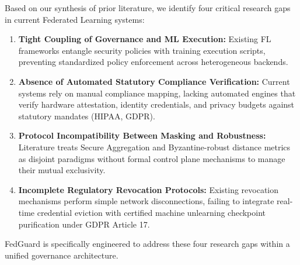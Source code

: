 Based on our synthesis of prior literature, we identify four critical research gaps in current Federated Learning systems:
\begin{enumerate}
    \item \textbf{Tight Coupling of Governance and ML Execution:} Existing FL frameworks entangle security policies with training execution scripts, preventing standardized policy enforcement across heterogeneous backends.
    \item \textbf{Absence of Automated Statutory Compliance Verification:} Current systems rely on manual compliance mapping, lacking automated engines that verify hardware attestation, identity credentials, and privacy budgets against statutory mandates (HIPAA, GDPR).
    \item \textbf{Protocol Incompatibility Between Masking and Robustness:} Literature treats Secure Aggregation and Byzantine-robust distance metrics as disjoint paradigms without formal control plane mechanisms to manage their mutual exclusivity.
    \item \textbf{Incomplete Regulatory Revocation Protocols:} Existing revocation mechanisms perform simple network disconnections, failing to integrate real-time credential eviction with certified machine unlearning checkpoint purification under GDPR Article 17.
\end{enumerate}
FedGuard is specifically engineered to address these four research gaps within a unified governance architecture.
